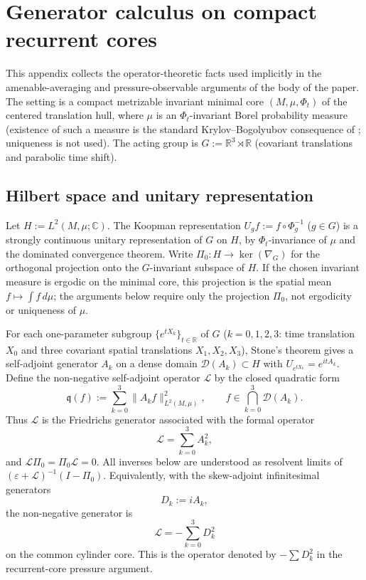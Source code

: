 \documentclass[11pt]{amsart}
\numberwithin{equation}{section}
\theoremstyle{plain}
\theoremstyle{definition}
\theoremstyle{remark}
\begin{document}
\section{Generator calculus on compact recurrent cores}
\label{app:generator-calculus}

This appendix collects the operator-theoretic facts used implicitly in the
amenable-averaging and pressure-observable arguments of the body of the
paper.  The setting is a compact metrizable invariant minimal core
\((M,\mu,\Phi_t)\) of the centered translation hull, where \(\mu\) is an
\(\Phi_t\)-invariant Borel probability measure (existence of such a
measure is the standard Krylov--Bogolyubov consequence of
; uniqueness is not used).  The acting group is
\(G:=\mathbb R^3\rtimes\mathbb R\) (covariant translations and parabolic
time shift).

\subsection{Hilbert space and unitary representation}
Let \(H:=L^2(M,\mu;\mathbb C)\).  The Koopman representation
\(U_g f:=f\circ\Phi_g^{-1}\) (\(g\in G\)) is a strongly continuous unitary
representation of \(G\) on \(H\), by \(\Phi_t\)-invariance of \(\mu\) and
the dominated convergence theorem.  Write \(\Pi_0:H\to\ker(\nabla_G)\) for
the orthogonal projection onto the \(G\)-invariant subspace of \(H\).  If the
chosen invariant measure is ergodic on the minimal core, this projection is the
spatial mean \(f\mapsto\int f\,d\mu\); the arguments below require only the
projection \(\Pi_0\), not ergodicity or uniqueness of \(\mu\).

For each one-parameter subgroup \(\{e^{tX_k}\}_{t\in\mathbb R}\) of \(G\)
(\(k=0,1,2,3\): time translation \(X_0\) and three covariant spatial
translations \(X_1,X_2,X_3\)), Stone's theorem gives a self-adjoint
generator \(A_k\) on a dense domain \(\mathcal D(A_k)\subset H\) with
\(U_{e^{tX_k}}=e^{itA_k}\).  Define the non-negative self-adjoint operator
\(\mathcal L\) by the closed quadratic form
\[
   \mathfrak q(f)
   :=
   \sum_{k=0}^3\|A_k f\|_{L^2(M,\mu)}^2,
   \qquad
   f\in\bigcap_{k=0}^3\mathcal D(A_k).
\]
Thus \(\mathcal L\) is the Friedrichs generator associated with the formal
operator
\[
   \mathcal L=\sum_{k=0}^3 A_k^2,
\]
and \(\mathcal L\Pi_0=\Pi_0\mathcal L=0\).  All inverses below are understood
as resolvent limits of \((\varepsilon+\mathcal L)^{-1}(I-\Pi_0)\).
Equivalently, with the skew-adjoint infinitesimal generators
\[
   D_k:=iA_k ,
\]
the non-negative generator is
\[
   \mathcal L=-\sum_{k=0}^3D_k^2
\]
on the common cylinder core.  This is the operator denoted by
\(-\sum D_k^2\) in the recurrent-core pressure argument.
\end{document}
